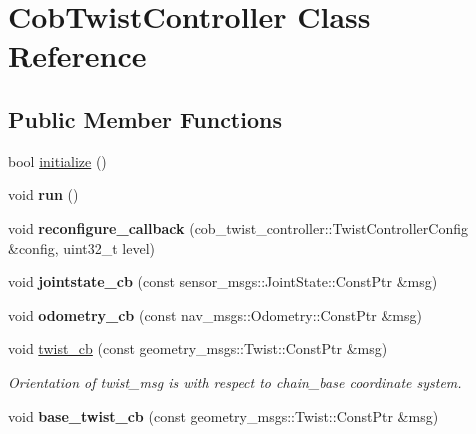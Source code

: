 \hypertarget{classCobTwistController}{\section{Cob\-Twist\-Controller Class Reference}
\label{classCobTwistController}
}
\subsection*{Public Member Functions}
\begin{DoxyCompactItemize}
\item 
bool \hyperlink{classCobTwistController_a9090539c07c0bfaef7d3e9c636cd1227}{initialize} ()
\item 
\hypertarget{classCobTwistController_a1aa93e5ae864cd5dba15f7f05069bb83}{void {\bfseries run} ()}\label{classCobTwistController_a1aa93e5ae864cd5dba15f7f05069bb83}

\item 
\hypertarget{classCobTwistController_a64f00b4e38aaa997b54c8c7cf2d2e56a}{void {\bfseries reconfigure\-\_\-callback} (cob\-\_\-twist\-\_\-controller\-::\-Twist\-Controller\-Config \&config, uint32\-\_\-t level)}\label{classCobTwistController_a64f00b4e38aaa997b54c8c7cf2d2e56a}

\item 
\hypertarget{classCobTwistController_a96e485efeff236806d5ce5ff163920cb}{void {\bfseries jointstate\-\_\-cb} (const sensor\-\_\-msgs\-::\-Joint\-State\-::\-Const\-Ptr \&msg)}\label{classCobTwistController_a96e485efeff236806d5ce5ff163920cb}

\item 
\hypertarget{classCobTwistController_af0cec45004d2902486cd54645fc29ca3}{void {\bfseries odometry\-\_\-cb} (const nav\-\_\-msgs\-::\-Odometry\-::\-Const\-Ptr \&msg)}\label{classCobTwistController_af0cec45004d2902486cd54645fc29ca3}

\item 
\hypertarget{classCobTwistController_a92c9f22fcbf87555371729c19ae87f91}{void \hyperlink{classCobTwistController_a92c9f22fcbf87555371729c19ae87f91}{twist\-\_\-cb} (const geometry\-\_\-msgs\-::\-Twist\-::\-Const\-Ptr \&msg)}\label{classCobTwistController_a92c9f22fcbf87555371729c19ae87f91}

\begin{DoxyCompactList}\small\item\em Orientation of twist\-\_\-msg is with respect to chain\-\_\-base coordinate system. \end{DoxyCompactList}\item 
\hypertarget{classCobTwistController_a7007a6628741fdbd97c840aedeb73617}{void {\bfseries base\-\_\-twist\-\_\-cb} (const geometry\-\_\-msgs\-::\-Twist\-::\-Const\-Ptr \&msg)}\label{classCobTwistController_a7007a6628741fdbd97c840aedeb73617}


\end{DoxyCompactItemize}
